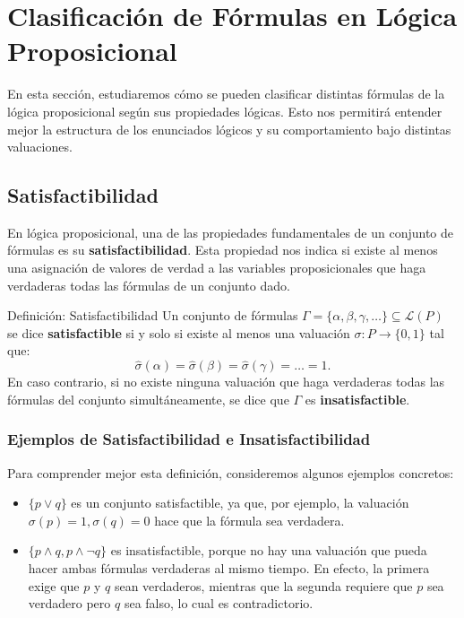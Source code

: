 \section{Clasificación de Fórmulas en Lógica Proposicional}

En esta sección, estudiaremos cómo se pueden clasificar distintas fórmulas de la lógica proposicional según sus propiedades lógicas. Esto nos permitirá entender mejor la estructura de los enunciados lógicos y su comportamiento bajo distintas valuaciones.

\subsection{Satisfactibilidad}

En lógica proposicional, una de las propiedades fundamentales de un conjunto de fórmulas es su \textbf{satisfactibilidad}. Esta propiedad nos indica si existe al menos una asignación de valores de verdad a las variables proposicionales que haga verdaderas todas las fórmulas de un conjunto dado.

\begin{thmblock}{Definición: Satisfactibilidad}
  Un conjunto de fórmulas \( \Gamma = \{\alpha, \beta, \gamma, \ldots\} \subseteq \mathcal{L}(P) \) se dice \textbf{satisfactible} si y solo si existe al menos una valuación \( \sigma \colon P \to \{0,1\} \) tal que:
  \[
    \hat{\sigma}(\alpha) = \hat{\sigma}(\beta) = \hat{\sigma}(\gamma) = \dots = 1.
  \]
  En caso contrario, si no existe ninguna valuación que haga verdaderas todas las fórmulas del conjunto simultáneamente, se dice que \( \Gamma \) es \textbf{insatisfactible}.
\end{thmblock}

\subsubsection*{Ejemplos de Satisfactibilidad e Insatisfactibilidad}

Para comprender mejor esta definición, consideremos algunos ejemplos concretos:

\begin{itemize}
  \item \( \{p \lor q\} \) es un conjunto satisfactible, ya que, por ejemplo, la valuación \( \sigma(p) = 1, \sigma(q) = 0 \) hace que la fórmula sea verdadera.
  \item \( \{p \land q, p \land \lnot q\} \) es insatisfactible, porque no hay una valuación que pueda hacer ambas fórmulas verdaderas al mismo tiempo. En efecto, la primera exige que \( p \) y \( q \) sean verdaderos, mientras que la segunda requiere que \( p \) sea verdadero pero \( q \) sea falso, lo cual es contradictorio.
\end{itemize}

